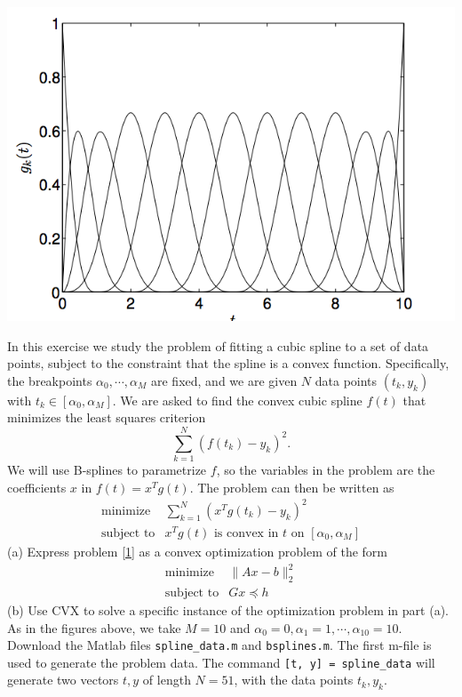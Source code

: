 \documentclass[12pt,a4paper]{article}
\renewcommand{\l}{\left}\renewcommand{\r}{\right}
\newcommand{\SUM}[2]{\sum\limits_{#1}^{#2}}
\begin{document}
\begin{center}
\includegraphics[scale=0.5]{hw2_p58-1.png}
\end{center}
In this exercise we study the problem of fitting a cubic spline to a set of data points, subject to the constraint that the spline is a convex function. Specifically, the breakpoints $\alpha_0, \cdots, \alpha_M$ are fixed, and we are given $N$ data points $(t_k, y_k)$ with $t_k \in [\alpha_0, \alpha_M]$. We are asked to find the convex cubic spline $f(t)$ that minimizes the least squares criterion
$$\SUM{k=1}N (f(t_k)-y_k)^2.$$
We will use B-splines to parametrize $f$, so the variables in the problem are the coefficients $x$ in $f(t) = x^Tg(t)$. The problem can then be written as 
\begin{equation}\label{1}
\begin{array}{ll}
\mbox{minimize}& \SUM{k=1}N \l(x^Tg(t_k)-y_k\r)^2\\
\mbox{subject to}& x^Tg(t) \mbox{ is convex in } t \mbox{ on } [\alpha_0, \alpha_M]
\end{array}\end{equation}
(a) Express problem \eqref{1} as a convex optimization problem of the form
$$\begin{array}{ll}
\mbox{minimize}& \|Ax-b\|^2_2\\
\mbox{subject to}& Gx \preceq h
\end{array}$$
(b) Use CVX to solve a specific instance of the optimization problem in part (a). As in the figures above, we take $M=10$ and $\alpha_0=0, \alpha_1=1, \cdots, \alpha_{10}=10$. \\
Download the Matlab files \texttt{spline\_data.m} and \texttt{bsplines.m}. The first m-file is used to generate the problem data. The command \texttt{[t, y] = spline\_data} will generate two vectors $t, y$ of length $N=51$, with the data points $t_k, y_k$.\\
\end{document}
